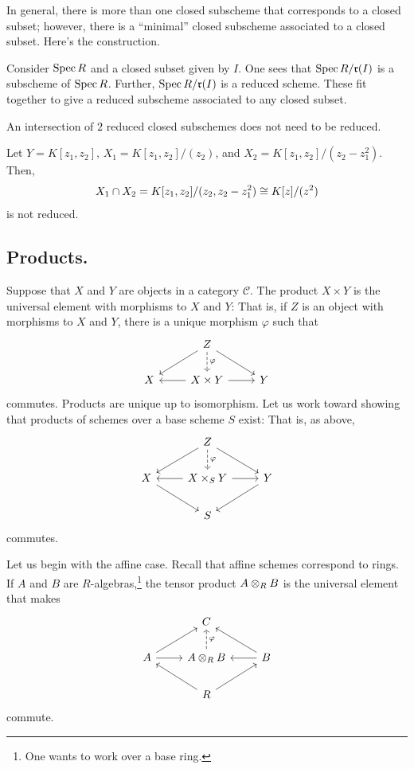 \documentclass [11 pt, oneside] {article}
\begin{document}
In general, there is more than one closed subscheme that corresponds to a closed subset; however, there is a ``minimal'' closed subscheme associated to a closed subset. Here's the construction.

Consider $\operatorname{Spec} R$ and a closed subset given by $I$. One sees that $\operatorname{Spec} R/ \mathfrak{r}({I}) $ is a subscheme of $\operatorname{Spec} R$. Further, $\operatorname{Spec} R/\mathfrak{r}({I}) $ is a reduced scheme. These fit together to give a reduced subscheme associated to any closed subset.

\begin{warn}
	An intersection of $2$ reduced closed subschemes does not need to be reduced.
\end{warn}

\begin{example}
Let $Y = K[z_1,z_2]$, $X_1 = K[z_1,z_2]/(z_2)$, and $X_2 = K[z_1,z_2] / (z_2-z_1^2)$. Then, 
\begin{align*}
	X_1\cap X_2 = K[z_1,z_2] / (z_2,z_2-z_1^2) \cong K[z]/(z^2)
\end{align*}
is not reduced.
\end{example}

\subsection{Products.}
Suppose that $X$ and $Y$ are objects in a category $\mathscr{C} $. The product $X\times Y$ is the universal element with morphisms to $X$ and $Y$: That is, if $Z$ is an object with morphisms to $X$ and $Y$, there is a unique morphism $\varphi$ such that
\[
\begin{tikzcd}
	&Z\ar[d,dashed, "\varphi"] \ar[dr]\ar[dl] \\
	X& X\times Y\ar[l]\ar[r]&Y
\end{tikzcd}
\]
commutes.
Products are unique up to isomorphism. Let us work toward showing that products of schemes over a base scheme $S$ exist: That is, as above,
\[
\begin{tikzcd}
	&Z\ar[dl] \ar[dr] \ar[d,dashed,"\varphi"] \\
	X\ar[dr]&X\times_S Y \ar[l]\ar[r] &Y\ar[dl]\\
	 &S
\end{tikzcd}
\]
commutes.

Let us begin with the affine case.
Recall that affine schemes correspond to rings. 
If $A$ and $B$ are $R$-algebras,\footnote{One wants to work over a base ring.} the tensor product $A\otimes_R B$ is the universal element that makes
\[
\begin{tikzcd}
	&C \\
	A\ar[ur] \ar[r]& A\tensor_R B\ar[u,dashed,swap,"\varphi"] & B\ar[l]\ar[ul]\\
		 & R \ar[ur]\ar[ul]
\end{tikzcd}
\]
commute.
\end{document}
